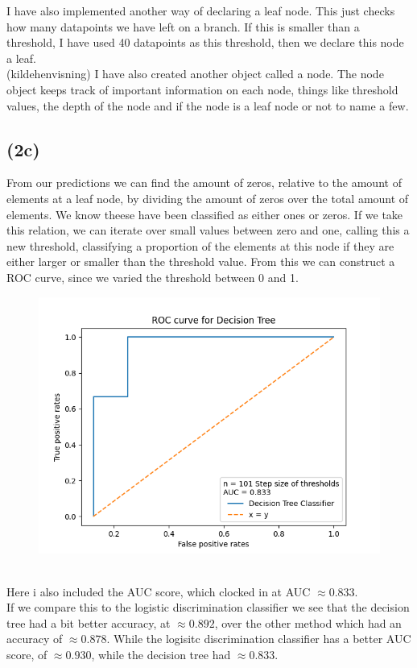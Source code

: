 \documentclass[12pt, letterpaper]{article}
\begin{document}
      I have also implemented another way of declaring a leaf node. This just checks how many datapoints we have left on a branch. If this is smaller than a threshold, I have used 40 datapoints as this threshold, then we declare this node a leaf.\\
      (kildehenvisning)
      I have also created another object called a node. The node object keeps track of important information on each node, things like threshold values, the depth of the node and if the node is a leaf node or not to name a few.
    \subsection*{(2c)}
      From our predictions we can find the amount of zeros, relative to the amount of elements at a leaf node, by dividing the amount of zeros over the total amount of elements. We know theese have been classified as either ones or zeros. If we take this relation, we can iterate over small values between zero and one, calling this a new threshold, classifying a proportion of the elements at this node if they are either larger or smaller than the threshold value. From this we can construct a ROC curve, since we varied the threshold between 0 and 1.\\
      \begin{figure}[H]
        \caption{}
        \centering
        \includegraphics[scale=0.8]{ROCDT}
      \end{figure}\\
      Here i also included the AUC score, which clocked in at AUC $\approx 0.833$.\\
      If we compare this to the logistic discrimination classifier we see that the decision tree had a bit better accuracy, at $\approx 0.892$, over the other method which had an accuracy of $\approx 0.878$. While the logisitc discrimination classifier has a better AUC score, of $\approx 0.930$, while the decision tree had $\approx 0.833$.
\end{document}
